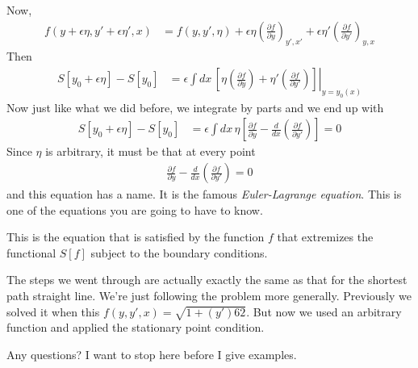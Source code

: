 Now,
\begin{align}
    f(y + \epsilon\eta, y' + \epsilon\eta', x) &=
    f(y, y', \eta)
    + \epsilon \eta {\left( \frac{\partial f}{\partial y} \right)}_{y',x'}
    + \epsilon \eta' {\left( \frac{\partial f}{\partial y'} \right)}_{y, x}
\end{align}
Then
\begin{align}
    S[y_0 + \epsilon\eta] - S[y_0] &=
    \epsilon\int dx\, \left.
        \left[
        \eta \left( \frac{\partial f}{\partial y} \right)
        + \eta'\left( \frac{\partial f}{\partial y'} \right)
        \right]
    \right|_{y=y_0(x)}
\end{align}
Now just like what we did before,
we integrate by parts
and we end up with
\begin{align}
    S[y_0 + \epsilon\eta] - S[y_0] &=
    \epsilon \int dx\,
    \eta
    \left[
        \frac{\partial f}{\partial y}
        -
        \frac{d}{dx}\left(
            \frac{\partial f}{\partial y'}
        \right)
    \right]
    =0
\end{align}
Since $\eta$ is arbitrary,
it must be that at every point
\begin{align}
    \frac{\partial f}{\partial y}
    -
    \frac{d}{dx}\left(
        \frac{\partial f}{\partial y'}
    \right)
    = 0
\end{align}
and this equation has a name.
It is the famous \emph{Euler-Lagrange equation}.
This is one of the equations you are going to have to know.

This is the equation that is satisfied by the function $f$
that extremizes the functional $S[f]$ subject to the boundary conditions.

The steps we went through are actually exactly the same as that for the shortest
path straight line.
We're just following the problem more generally.
Previously we solved it when this $f(y,y',x) = \sqrt{1 + (y')62}$.
But now we used an arbitrary function and applied the stationary point
condition.

Any questions?
I want to stop here before I give examples.


